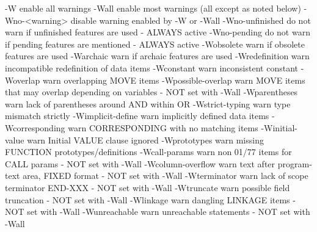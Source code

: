   -W                    enable all warnings
  -Wall                 enable most warnings (all except as noted below)
  -Wno-<warning>        disable warning enabled by -W or -Wall
  -Wno-unfinished      	do not warn if unfinished features are used
			- ALWAYS active
  -Wno-pending         	do not warn if pending features are mentioned
			- ALWAYS active
  -Wobsolete           	warn if obsolete features are used
  -Warchaic            	warn if archaic features are used
  -Wredefinition       	warn incompatible redefinition of data items
  -Wconstant           	warn inconsistent constant
  -Woverlap            	warn overlapping MOVE items
  -Wpossible-overlap   	warn MOVE items that may overlap depending on variables
			- NOT set with -Wall
  -Wparentheses        	warn lack of parentheses around AND within OR
  -Wstrict-typing      	warn type mismatch strictly
  -Wimplicit-define    	warn implicitly defined data items
  -Wcorresponding      	warn CORRESPONDING with no matching items
  -Winitial-value      	warn Initial VALUE clause ignored
  -Wprototypes         	warn missing FUNCTION prototypes/definitions
  -Wcall-params        	warn non 01/77 items for CALL params
			- NOT set with -Wall
  -Wcolumn-overflow    	warn text after program-text area, FIXED format
			- NOT set with -Wall
  -Wterminator         	warn lack of scope terminator END-XXX
			- NOT set with -Wall
  -Wtruncate           	warn possible field truncation
			- NOT set with -Wall
  -Wlinkage            	warn dangling LINKAGE items
			- NOT set with -Wall
  -Wunreachable        	warn unreachable statements
			- NOT set with -Wall

